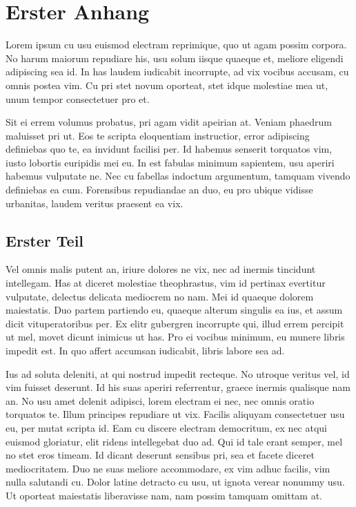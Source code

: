 \chapter{Erster Anhang}
\label{erster_anhang}
Lorem ipsum cu usu euismod electram reprimique, quo ut agam possim corpora. No harum maiorum repudiare his, usu solum iisque quaeque et, meliore eligendi adipiscing sea id. In has laudem iudicabit incorrupte, ad vix vocibus accusam, cu omnis postea vim. Cu pri stet novum oporteat, stet idque molestiae mea ut, unum tempor consectetuer pro et.

Sit ei errem volumus probatus, pri agam vidit apeirian at. Veniam phaedrum maluisset pri ut. Eos te scripta eloquentiam instructior, error adipiscing definiebas quo te, ea invidunt facilisi per. Id habemus senserit torquatos vim, iusto lobortis euripidis mei eu. In est fabulas minimum sapientem, usu aperiri habemus vulputate ne. Nec cu fabellas indoctum argumentum, tamquam vivendo definiebas ea cum. Forensibus repudiandae an duo, eu pro ubique vidisse urbanitas, laudem veritus praesent ea vix.

\section{Erster Teil}
\label{a_erster_teil}
Vel omnis malis putent an, iriure dolores ne vix, nec ad inermis tincidunt intellegam. Has at diceret molestiae theophrastus, vim id pertinax evertitur vulputate, delectus delicata mediocrem no nam. Mei id quaeque dolorem maiestatis. Duo partem partiendo eu, quaeque alterum singulis ea ius, et assum dicit vituperatoribus per. Ex elitr gubergren incorrupte qui, illud errem percipit ut mel, movet dicunt inimicus ut has. Pro ei vocibus minimum, eu munere libris impedit est. In quo affert accumsan iudicabit, libris labore sea ad.

Ius ad soluta deleniti, at qui nostrud impedit recteque. No utroque veritus vel, id vim fuisset deserunt. Id his suas aperiri referrentur, graece inermis qualisque nam an. No usu amet delenit adipisci, lorem electram ei nec, nec omnis oratio torquatos te. Illum principes repudiare ut vix. Facilis aliquyam consectetuer usu eu, per mutat scripta id. Eam cu discere electram democritum, ex nec atqui euismod gloriatur, elit ridens intellegebat duo ad. Qui id tale erant semper, mel no stet eros timeam. Id dicant deserunt sensibus pri, sea et facete diceret mediocritatem. Duo ne suas meliore accommodare, ex vim adhuc facilis, vim nulla salutandi cu. Dolor latine detracto cu usu, ut ignota verear nonummy usu. Ut oporteat maiestatis liberavisse nam, nam possim tamquam omittam at.

